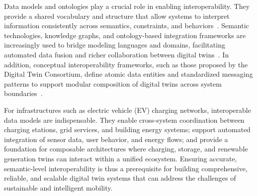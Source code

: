 Data models and ontologies play a crucial role in enabling interoperability. They provide a shared vocabulary and structure that allow systems to interpret information consistently across semantics, constraints, and behaviors~\cite{Karabulut2023}. Semantic technologies, knowledge graphs, and ontology-based integration frameworks are increasingly used to bridge modeling languages and domains, facilitating automated data fusion and richer collaboration between digital twins~\cite{Dunbar2022}. In addition, conceptual interoperability frameworks, such as those proposed by the Digital Twin Consortium, define atomic data entities and standardized messaging patterns to support modular composition of digital twins across system boundaries~\cite{Budiardjo2021}.

For infrastructures such as electric vehicle (EV) charging networks, interoperable data models are indispensable. They enable cross-system coordination between charging stations, grid services, and building energy systems; support automated integration of sensor data, user behavior, and energy flows; and provide a foundation for composable architectures where charging, storage, and renewable generation twins can interact within a unified ecosystem. Ensuring accurate, semantic-level interoperability is thus a prerequisite for building comprehensive, reliable, and scalable digital twin systems that can address the challenges of sustainable and intelligent mobility.
